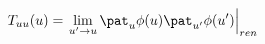 \begin{equation}
T_{uu}(u) = \left.\lim_{u'\rightarrow u} \pat_u \phi (u)
\pat_{u'} \phi (u')\right|_{ren}
\end{equation}

